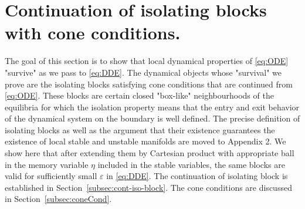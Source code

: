 \documentclass[11pt, leqno]{amsart}
\theoremstyle{definition}
\begin{document}
		
\section{Continuation of  isolating blocks with cone conditions.}
\label{sec:LapCC}


The goal of this section is to show that local  dynamical properties of \eqref{eq:ODE} "survive" as we pass to \eqref{eq:DDE}.
The dynamical objects whose "survival" we prove  are
 the isolating blocks satisfying cone conditions that are continued from \eqref{eq:ODE}. These blocks are certain closed "box-like" neighbourhoods of the equilibria for which the isolation property means that the entry and exit behavior of the dynamical system on the boundary is well defined. The precise definition of isolating blocks as well as the argument that their existence guarantees the existence of local stable and unstable manifolds are moved to Appendix 2. We show here that after extending them by Cartesian product with appropriate ball in the memory variable $\eta$ included in the stable variables, the same blocks are valid   for sufficiently small $\varepsilon$ in \eqref{eq:DDE}. The continuation of isolating block is established in Section~\ref{subsec:cont-iso-block}. The cone conditions are discussed in Section~\ref{subsec:coneCond}.
\end{document}
